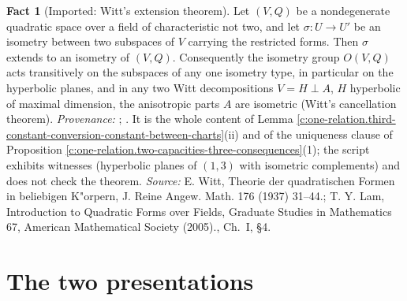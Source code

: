 \documentclass[11pt]{article}
\theoremstyle{definition}
\newtheorem{fact}[theorem]{Fact}
\theoremstyle{plain}
\begin{document}
\begin{fact}[Imported: Witt's extension theorem]\label{c:one-relation.imported-witts-extension-theorem}
Let $(V, Q)$ be a nondegenerate quadratic space over a field of characteristic not two, and let $\sigma : U \to U'$ be an isometry between two subspaces of $V$ carrying the restricted forms. Then $\sigma$ extends to an isometry of $(V, Q)$. Consequently the isometry group $O(V, Q)$ acts transitively on the subspaces of any one isometry type, in particular on the hyperbolic planes, and in any two Witt decompositions $V = H \perp A$, $H$ hyperbolic of maximal dimension, the anisotropic parts $A$ are isometric (Witt's cancellation theorem). \emph{Provenance:} \cite{Witt1937}; \cite[Ch.~I, \S4]{Lam2005}. It is the whole content of Lemma \ref{c:one-relation.third-constant-conversion-constant-between-charts}(ii) and of the uniqueness clause of Proposition \ref{c:one-relation.two-capacities-three-consequences}(1); the script exhibits witnesses (hyperbolic planes of $(1,3)$ with isometric complements) and does not check the theorem.
\emph{Source:} E. Witt, Theorie der quadratischen Formen in beliebigen K"orpern, J. Reine Angew. Math. 176 (1937) 31--44.; T. Y. Lam, Introduction to Quadratic Forms over Fields, Graduate Studies in Mathematics 67, American Mathematical Society (2005)., Ch.~I, \S4.
\end{fact}

\section{The two presentations}
\end{document}
